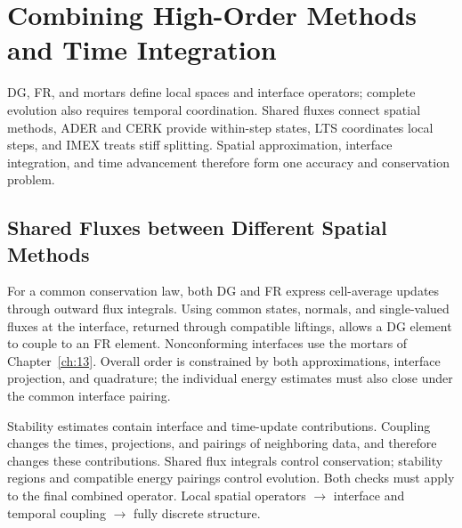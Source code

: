 \chapter{Combining High-Order Methods and Time Integration}\label{ch:14}
\begin{chaptersummary}
DG, FR, and mortars define local spaces and interface operators; complete evolution also requires temporal coordination. Shared fluxes connect spatial methods, ADER and CERK provide within-step states, LTS coordinates local steps, and IMEX treats stiff splitting. Spatial approximation, interface integration, and time advancement therefore form one accuracy and conservation problem.
\end{chaptersummary}

\section{Shared Fluxes between Different Spatial Methods}
For a common conservation law, both DG and FR express cell-average updates through outward flux integrals.
Using common states, normals, and single-valued fluxes at the interface, returned through compatible liftings,
allows a DG element to couple to an FR element. Nonconforming interfaces use the mortars of Chapter~\ref{ch:13}.
Overall order is constrained by both approximations, interface projection, and quadrature;
the individual energy estimates must also close under the common interface pairing.

{Stability estimates contain interface and time-update contributions. Coupling changes the times, projections, and pairings of neighboring data,
and therefore changes these contributions. Shared flux integrals control conservation; stability regions and compatible energy pairings control evolution.
Both checks must apply to the final combined operator.}
{Local spatial operators $\longrightarrow$ interface and temporal coupling $\longrightarrow$ fully discrete structure.}

